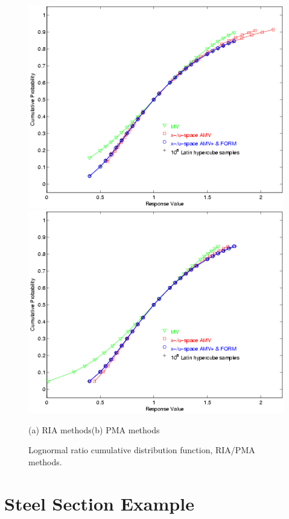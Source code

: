 \begin{figure}
\centering
\centerline{\includegraphics[scale=0.5]{images/log_ratio_cdf_ria}
            \includegraphics[scale=0.5]{images/log_ratio_cdf_pma}}
(a) RIA methods\hspace{2.5in}(b) PMA methods
\caption{Lognormal ratio cumulative distribution function, RIA/PMA methods.}
\label{fig:log_ratio_cdf}
\end{figure}

\section{Steel Section Example}\label{additional:steel_section}

